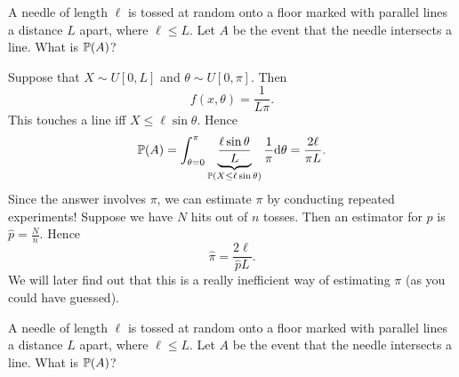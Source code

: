 \begin{note}
  \begin{field}
    \begin{eg}
      A needle of length $\ell$ is tossed at random onto a floor marked with parallel lines a distance $L$ apart, where $\ell \leq L$. Let $A$ be the event that the needle intersects a line. What is $\P(A)$?
      \begin{center}
      \end{center}
      Suppose that $X\sim U[0, L]$ and $\theta\sim U[0, \pi]$. Then
      \[
        f(x, \theta) = \frac{1}{L\pi}.
      \]
      This touches a line iff $X \leq \ell \sin \theta$. Hence
      \[
        \P(A) = \int_{\theta = 0}^\pi \underbrace{\frac{\ell \sin \theta}{L}}_{\P(X \leq \ell\sin \theta)}\frac{1}{\pi}\d \theta = \frac{2\ell }{\pi L}.
      \]
      Since the answer involves $\pi$, we can estimate $\pi$ by conducting repeated experiments! Suppose we have $N$ hits out of $n$ tosses. Then an estimator for $p$ is $\hat{p} = \frac{N}{n}$. Hence
      \[
        \hat{\pi} = \frac{2\ell}{\hat{p}L}.
      \]
      We will later find out that this is a really inefficient way of estimating $\pi$ (as you could have guessed).
    \end{eg}
  \end{field}
  \begin{field}
    \begin{eg}
      A needle of length $\ell$ is tossed at random onto a floor marked with parallel lines a distance $L$ apart, where $\ell \leq L$. Let $A$ be the event that the needle intersects a line. What is $\P(A)$?
      \begin{center}
\end{center}
\end{eg}
\end{field}
\end{note}
